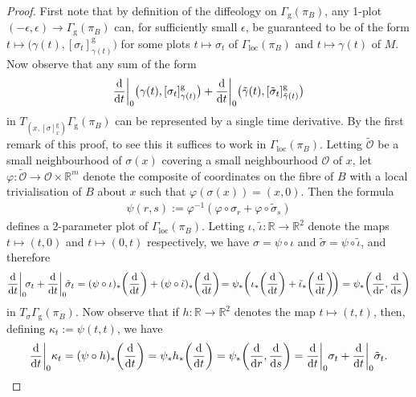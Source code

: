 \documentclass[pdftex]{sigma}
\numberwithin{equation}{section}
\def\loc{\operatorname{loc}}
\def\g{\operatorname{g}}
\def\OO{{\mathcal{O}}}
\def\RB{{\mathbb{R}}}
\begin{document}
\begin{proof}
First note that by definition of the diffeology on $\Gamma_{\g}(\pi_{B})$, any 1-plot $(-\epsilon,\epsilon)\rightarrow\Gamma_{\g}(\pi_{B})$ can, for sufficiently small $\epsilon$, be guaranteed to be of the form $t\mapsto \big(\gamma(t),[\sigma_{t}]^{\g}_{\gamma(t)}\big)$ for some plots $t\mapsto\sigma_{t}$ of $\Gamma_{\loc}(\pi_{B})$ and $t\mapsto\gamma(t)$ of $M$. Now observe that any sum of the form
\begin{gather*}
\frac{\rm d}{{\rm d}t}\bigg|_{0}\big(\gamma(t),[\sigma_{t}]^{\g}_{\gamma(t)}\big) +\frac{\rm d}{{\rm d}t}\bigg|_{0}\big(\tilde{\gamma}(t),[\tilde{\sigma}_{t}]^{\g}_{\tilde{\gamma}(t)}\big)
\end{gather*}
in $T_{\left(x,[\sigma]^{\g}_{x}\right)}\Gamma_{\g}(\pi_{B})$ can be represented by a single time derivative. By the first remark of this proof, to see this it suffices to work in $\Gamma_{\loc}(\pi_{B})$. Letting $\tilde{\OO}$ be a small neighbourhood of $\sigma(x)$ covering a small neighbourhood $\OO$ of $x$, let $\varphi\colon \tilde{\OO}\rightarrow\OO\times\RB^{m}$ denote the composite of coordinates on the fibre of $B$ with a local trivialisation of $B$ about $x$ such that $\varphi(\sigma(x)) = (x,0)$. Then the formula
\begin{gather*}%
\psi(r,s):=\varphi^{-1}(\varphi\circ\sigma_{r}+\varphi\circ\tilde{\sigma}_{s})
\end{gather*}
defines a 2-parameter plot of $\Gamma_{\loc}(\pi_{B})$. Letting $\iota,\,\tilde{\iota}\colon \RB\rightarrow\RB^{2}$ denote the maps $t\mapsto(t,0)$ and $t\mapsto(0,t)$ respectively, we have $\sigma = \psi\circ\iota$ and $\tilde{\sigma} =\psi\circ\tilde{\iota}$, and therefore
\begin{gather*}
\frac{\rm d}{{\rm d}t}\bigg|_{0}\!\sigma_{t}+\frac{\rm d}{{\rm d}t}\bigg|_{0}\!\tilde{\sigma}_{t} =(\psi\circ\iota)_{*}\bigg(\frac{\rm d}{{\rm d}t}\bigg)+(\psi\circ\tilde{\iota})_{*}\bigg(\frac{\rm d}{{\rm d}t}\bigg)\! = \psi_{*}\bigg(\iota_{*}\bigg(\frac{\rm d}{{\rm d}t}\bigg)+\tilde{\iota}_{*}\bigg(\frac{\rm d}{{\rm d}t}\bigg)\!\bigg) = \psi_{*}\bigg(\frac{\rm d}{{\rm d}r},\frac{\rm d}{{\rm d}s}\bigg)
\end{gather*}
in $T_{\sigma}\Gamma_{\g}(\pi_{B})$. Now observe that if $h\colon \RB\rightarrow\RB^{2}$ denotes the map $t\mapsto(t,t)$, then, defining $\kappa_{t}:=\psi(t,t)$, we have
\begin{gather*}
\frac{\rm d}{{\rm d}t}\bigg|_{0}\kappa_{t} = (\psi\circ h)_{*}\bigg(\frac{\rm d}{{\rm d}t}\bigg) = \psi_{*}h_{*}\bigg(\frac{\rm d}{{\rm d}t}\bigg) = \psi_{*}\bigg(\frac{\rm d}{{\rm d}r},\frac{\rm d}{{\rm d}s}\bigg) = \frac{\rm d}{{\rm d}t}\bigg|_{0}\sigma_{t}+\frac{\rm d}{{\rm d}t}\bigg|_{0}\tilde{\sigma}_{t}.

\end{gather*}
\end{proof}
\end{document}
